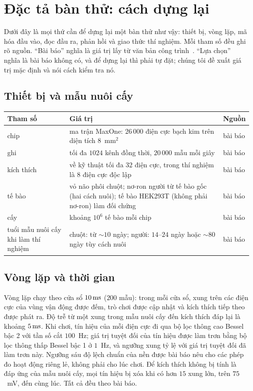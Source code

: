 \section{Đặc tả bàn thử: cách dựng lại}
\label{sec:dishspec}

Dưới đây là mọi thứ cần để dựng lại một bàn thử như vậy: thiết bị, vòng lặp, mã hóa đầu vào, đọc đầu ra, phản hồi và giao thức thí nghiệm. Mỗi tham số đều ghi rõ nguồn. ``Bài báo'' nghĩa là giá trị lấy từ văn bản công trình~\cite{Kagan2022}. ``Lựa chọn'' nghĩa là bài báo không có, và để dựng lại thì phải tự đặt; chúng tôi đề xuất giá trị mặc định và nói cách kiểm tra nó.

\subsection*{Thiết bị và mẫu nuôi cấy}

\begin{center}
\footnotesize
\setlength{\tabcolsep}{4pt}
\renewcommand{\arraystretch}{1.15}
\begin{tabular}{>{\raggedright}p{4.0cm}>{\raggedright}p{6.9cm}>{\raggedright\arraybackslash}p{1.6cm}}
\toprule
Tham số & Giá trị & Nguồn \\
\midrule
chip & ma trận MaxOne: $26\,000$ điện cực bạch kim trên diện tích $8$~mm$^2$ & bài báo \\
ghi & tối đa $1024$ kênh đồng thời, $20\,000$ mẫu mỗi giây & bài báo \\
kích thích & về kỹ thuật tối đa $32$ điện cực, trong thí nghiệm là $8$ điện cực độc lập & bài báo \\
tế bào & vỏ não phôi chuột; nơ-ron người từ tế bào gốc (hai cách nuôi); tế bào HEK293T (không phải nơ-ron) làm đối chứng & bài báo \\
cấy & khoảng $10^6$ tế bào mỗi chip & bài báo \\
tuổi mẫu nuôi cấy khi làm thí nghiệm & chuột: từ $\sim10$ ngày; người: $14$--$24$ ngày hoặc $\sim80$ ngày tùy cách nuôi & bài báo \\
\bottomrule
\end{tabular}
\end{center}

\subsection*{Vòng lặp và thời gian}

Vòng lặp chạy theo cửa sổ $10\,\text{ms}$ ($200$ mẫu): trong mỗi cửa sổ, xung trên các điện cực của vùng vận động được đếm, trò chơi được cập nhật và kích thích tiếp theo được phát ra. Độ trễ từ một xung trong mẫu nuôi cấy đến kích thích đáp lại là khoảng $5\,\text{ms}$. Khi chơi, tín hiệu của mỗi điện cực đi qua bộ lọc thông cao Bessel bậc 2 với tần số cắt $100$~Hz; giá trị tuyệt đối của tín hiệu được làm trơn bằng bộ lọc thông thấp Bessel bậc 1 ở $1$~Hz, và ngưỡng xung tỷ lệ với giá trị tuyệt đối đã làm trơn này. Ngưỡng sáu độ lệch chuẩn của nền được bài báo nêu cho các phép đo hoạt động riêng lẻ, không phải cho lúc chơi. Để kích thích không bị tính là đáp ứng của mẫu nuôi cấy, mọi tín hiệu bị xóa khi có hơn $15$ xung lớn, trên $75$~mV, đến cùng lúc. Tất cả đều theo bài báo.


